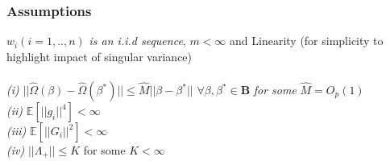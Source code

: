 \documentclass{beamer}
\begin{document}
\begin{frame}
\frametitle{Assumptions}
$w_i (i=1,..,n)$ \textit{is an i.i.d sequence}, $m<\infty$  and Linearity (for simplicity to highlight impact of singular variance)\\
\vspace{10pt}
\\

\textit{(i)} $|\!| \hat{\Omega}(\beta)-\hat{\Omega}(\beta^*)|\!|\leq \hat{M} |\!| \beta-\beta^*|\!| $ $\forall \beta,\beta^* \in \mathbf{B}$ \textit{for some} $\hat{M}=O_p(1)$\\
\textit{(ii)}  $\mathbb{E}[|\!| g_i|\!|^4] <\infty$\\

 \textit{(iii)} $\mathbb{E}[|\!| G_i|\!|^2] <\infty$\\

 \textit{(iv)} $|\!|\Lambda_+|\!|\leq K$ for some $K<\infty$\\


      \end{frame}
\end{document}
